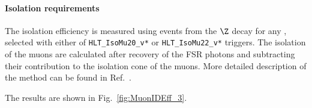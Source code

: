 
\paragraph*{Isolation requirements}
The isolation efficiency is measured using events from the $\Z$ decay for any \pt, selected with either of \verb=HLT_IsoMu20_v*= or \verb=HLT_IsoMu22_v*= triggers. The isolation of the muons are calculated after recovery of the FSR photons and subtracting their contribution to the isolation cone of the muons. More detailed description of the method can be found in Ref.~\cite{AN-16-217}.

The results are shown in Fig.~\ref{fig:MuonIDEff_3}.

